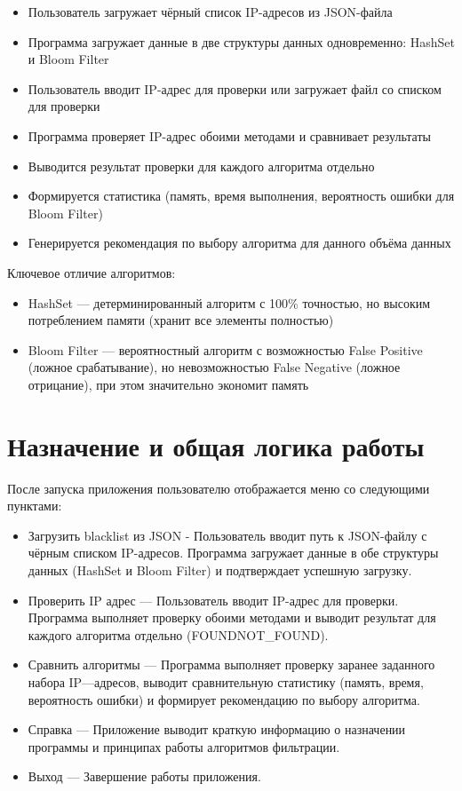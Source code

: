 \begin{itemize}
	\item Пользователь загружает чёрный список IP-адресов из JSON-файла
	\item Программа загружает данные в две структуры данных одновременно: HashSet и Bloom Filter
	\item Пользователь вводит IP-адрес для проверки или загружает файл со списком для проверки
	\item Программа проверяет IP-адрес обоими методами и сравнивает результаты
	\item Выводится результат проверки для каждого алгоритма отдельно
	\item Формируется статистика (память, время выполнения, вероятность ошибки для Bloom Filter)
	\item Генерируется рекомендация по выбору алгоритма для данного объёма данных
\end{itemize} 

Ключевое отличие алгоритмов:
\begin{itemize}
    \item HashSet — детерминированный алгоритм с 100\% точностью, но высоким потреблением памяти (хранит все элементы полностью)
    \item Bloom Filter — вероятностный алгоритм с возможностью False Positive (ложное срабатывание), но невозможностью False Negative (ложное отрицание), при этом значительно экономит память
\end{itemize}

\section{Назначение и общая логика работы} \label{ch1:sec2}

После запуска приложения пользователю отображается меню со следующими пунктами:

\begin{itemize}
	\item Загрузить blacklist из JSON - Пользователь вводит путь к JSON-файлу с чёрным списком IP-адресов. Программа загружает данные в обе структуры данных (HashSet и Bloom Filter) и подтверждает успешную загрузку.
	\item Проверить IP адрес — Пользователь вводит IP-адрес для проверки. Программа выполняет проверку обоими методами и выводит результат для каждого алгоритма отдельно (FOUND\/NOT\_FOUND).
	\item Сравнить алгоритмы — Программа выполняет проверку заранее заданного набора IP—адресов, выводит сравнительную статистику (память, время, вероятность ошибки) и формирует рекомендацию по выбору алгоритма.
	\item Справка — Приложение выводит краткую информацию о назначении программы и принципах работы алгоритмов фильтрации.
	\item Выход — Завершение работы приложения.
\end{itemize} 

